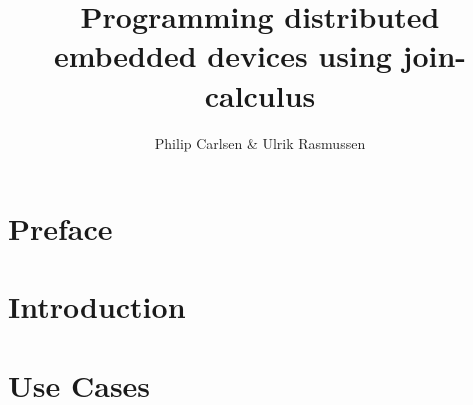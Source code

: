 \documentclass[a4paper, oneside, draft]{memoir}
\title{Programming distributed embedded devices using join-calculus}
\author{Philip Carlsen \& Ulrik Rasmussen}
\begin{document}
\frontmatter

\maketitle

\begin{abstract}

\end{abstract}

\clearpage
\chapter*{Preface}


\clearpage

\tableofcontents*


\mainmatter

\chapter{Introduction}


\chapter{Use Cases}




\end{document}
